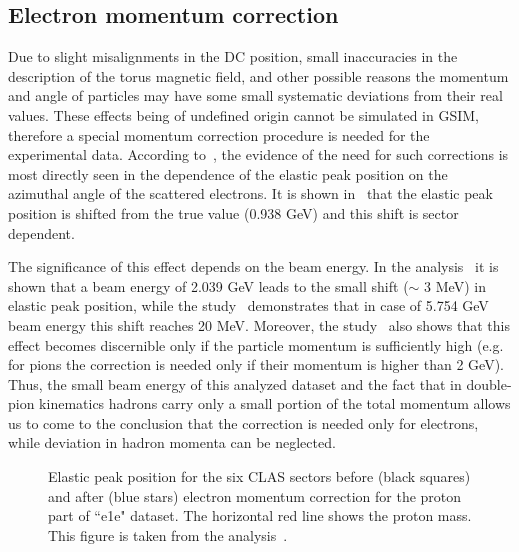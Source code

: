 \subsection{Electron momentum correction}
\label{Sect:el_momcor}

Due to slight misalignments in the DC position, small inaccuracies in the description of the torus magnetic field, and other possible reasons the momentum and angle of particles may have some small systematic deviations from their real values. These effects being of undefined origin cannot be simulated in GSIM, therefore a special momentum correction procedure is needed for the experimental data. According to~\cite{KPark:momcorr}, the evidence of the need for such corrections is most directly seen in the dependence of the elastic peak position on the azimuthal angle of the scattered electrons. It is shown in~\cite{KPark:momcorr} that the elastic peak position is shifted from the true value (0.938 GeV) and this shift is sector dependent.  

The significance of this effect depends on the beam energy. In the analysis~\cite{Fed_an_note:2017} it is shown that a beam energy of 2.039 GeV leads to the small shift ($\sim$ 3 MeV) in elastic peak position, while the study~\cite{KPark:momcorr} demonstrates that in case of  5.754 GeV beam energy this shift reaches 20 MeV. Moreover, the study~\cite{KPark:momcorr} also shows that this effect becomes discernible only if the particle momentum is sufficiently high (e.g. for pions the correction is needed only if their momentum is higher than 2 GeV). Thus, the small beam energy of this analyzed dataset and the fact that in double-pion kinematics hadrons carry only a small portion of the total momentum allows us to come to the conclusion that the correction is needed only for electrons, while deviation in hadron momenta can be neglected.

\begin{figure}[htp]
\begin{center}
\caption{\small Elastic peak position for the six CLAS sectors before (black squares) and after (blue stars) electron momentum correction for the proton part of ``e1e" dataset. The horizontal red line shows the proton mass. This figure is taken from the analysis~\cite{Fed_an_note:2017}. \label{fig:el_mom_corr_peak_position}} 
\end{center}
\end{figure}

